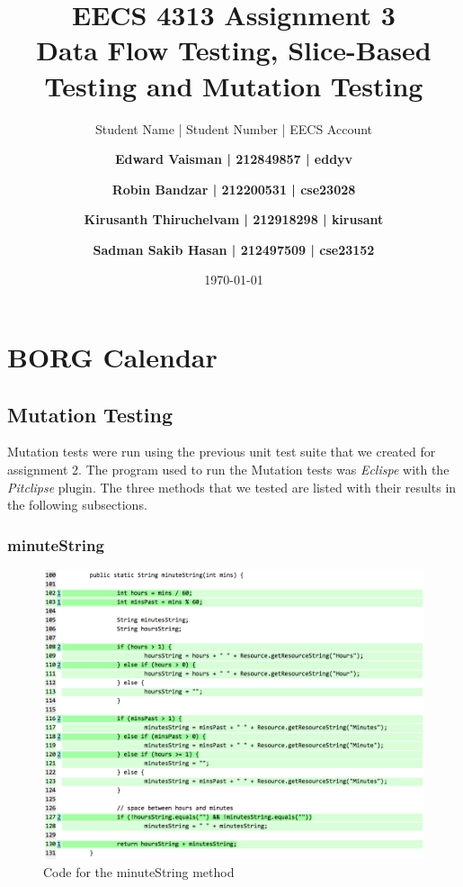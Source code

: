 \documentclass[fontsize=12pt,paper=letter,twoside]{scrartcl}
\author{Student Name | Student Number | EECS Account
\and \textbf{Edward Vaisman | 212849857 | eddyv}
\and \textbf{Robin Bandzar | 212200531 | cse23028}
\and \textbf{Kirusanth Thiruchelvam | 212918298 | kirusant}
\and \textbf{Sadman Sakib Hasan | 212497509 | cse23152}
}
\date{\today} %
\begin{document}
\title{EECS 4313 Assignment 3 \\Data Flow Testing, Slice-Based Testing and Mutation Testing}
\maketitle

\newpage

\tableofcontents


\newpage


\section{BORG Calendar}

\subsection{Mutation Testing}
Mutation tests were run using the previous unit test suite that we created for assignment 2. The program used to run the Mutation tests was \emph{Eclispe} with the \emph{Pitclipse} plugin. The three methods that we tested are listed with their results in the following subsections. 

\subsubsection{minuteString}


\begin{figure}[H]
\begin{center}
\includegraphics[width=.99\textwidth]{images/MutationTesting/minuteStringCode.png}
\end{center}
\caption{Code for the minuteString method}
\label{fig:minuteStringCode}
\end{figure}
\end{document}
